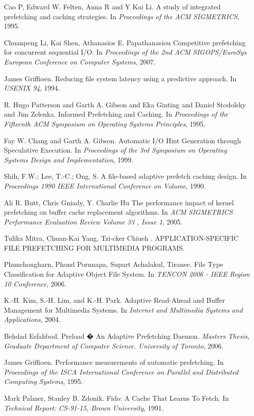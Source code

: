 \documentclass[twocolumn,10pt]{article}
\begin{document}
\begin{thebibliography}{99}

 Cao P, Edward W. Felten, Anna R and Y Kai Li.
	A study of integrated prefetching and caching strategies.
	In {\em Proceedings of the ACM SIGMETRICS}, 1995.
	
 Chuanpeng Li, Kai Shen, Athanasios E. Papathanasiou
	Competitive prefetching for concurrent sequential I/O.
	In {\em Proceedings of the 2nd ACM SIGOPS/EuroSys European Conference on Computer Systems}, 2007.

 James Griffioen.
	Reducing file system latency using a predictive approach.
	In {\em USENIX 94}, 1994.

 R. Hugo Patterson and Garth A. Gibson and Eka Ginting and Daniel Stodolsky and Jim Zelenka.
	Informed Prefetching and Caching.
	In {\em Proceedings of the Fifteenth ACM Symposium on Operating Systems Principles}, 1995.
	
 Fay W. Chang and Garth A. Gibson.
	Automatic I/O Hint Generation through Speculative Execution.
	In {\em Proceedings of the 3rd Symposium on Operating Systems Design and Implementation}, 1999.

 Shih, F.W.; Lee, T.-C.; Ong, S.
	A file-based adaptive prefetch caching design.
	In {\em Proceedings 1990 IEEE International Conference on Volume}, 1990.

 Ali R. Butt, Chris Gniady, Y. Charlie Hu
	The performance impact of kernel prefetching on buffer cache replacement algorithms.
	In {\em ACM SIGMETRICS Performance Evaluation Review Volume 33 , Issue 1}, 2005.

 Tulika Mitra, Chuan-Kai Yang, Tzi-cker Chiueh	.
	APPLICATION-SPECIFIC FILE PREFETCHING FOR MULTIMEDIA PROGRAMS.

Phunchongharn, Phond Pornnapa, Supart Achalakul, Tiranee.
	File Type Classification for Adaptive Object File System.
	In {\em TENCON 2006 - IEEE Region 10 Conference}, 2006.

 K.-H. Kim, S.-H. Lim, and K.-H. Park.
	Adaptive Read-Ahead and Buffer Management for Multimedia Systems.
	In {\em Internet and Multimedia Systems and Applications}, 2004.
	
 Behdad Esfahbod.
	Preload � An Adaptive Prefetching Daemon.
	{\em Masters Thesis, Graduate Department of Computer Science. University of Toronto}, 2006.

 James Griffioen.
	Performance measurements of automatic prefetching.
	In {\em Proceedings of the ISCA International Conference on Parallel and Distributed Computing Systems}, 1995.

 Mark Palmer, Stanley B. Zdonik.
	Fido: A Cache That Learns To Fetch.
	In {\em Technical Report: CS-91-15, Brown University}, 1991.

	
\end{thebibliography}
\end{document}
